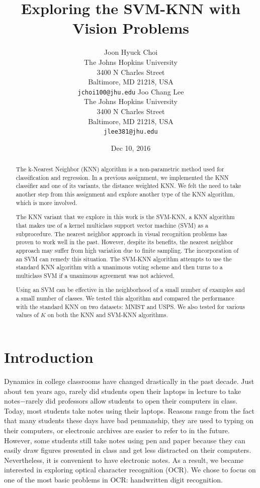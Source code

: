 \documentclass[11pt,letterpaper]{article}
\title{Exploring the SVM-KNN with Vision Problems}
\author{Joon Hyuck Choi\\
  The Johns Hopkins University\\
  3400 N Charles Street\\
  Baltimore, MD 21218, USA\\
  {\tt jchoi100@jhu.edu}
  \And
  Joo Chang Lee \\
  The Johns Hopkins University \\
  3400 N Charles Street\\
  Baltimore, MD 21218, USA\\
  {\tt jlee381@jhu.edu}}
\date{Dec 10, 2016}
\begin{document}
\maketitle
\begin{abstract}
The k-Nearest Neighbor (KNN) algorithm is a non-parametric method used for classification and regression. In a previous assignment, we implemented the KNN classifier and one of its variants, the distance weighted KNN. We felt the need to take another step from this assignment and explore another type of the KNN algorithm, which is more involved.

The KNN variant that we explore in this work is the SVM-KNN, a KNN algorithm that makes use of a kernel multiclass support vector machine (SVM) as a subprocedure. The nearest neighbor approach in visual recognition problems has proven to work well in the past. However, despite its benefits, the nearest neighbor approach may suffer from high variation due to finite sampling. The incorporation of an SVM can remedy this situation. The SVM-KNN algorithm attempts to use the standard KNN algorithm with a unanimous voting scheme and then turns to a multiclass SVM if a unanimous agreement was not achieved.

Using an SVM can be effective in the neighborhood of a small number of examples and a small number of classes. We tested this algorithm and compared the performance with the standard KNN on two datasets: MNIST and USPS. We also tested for various values of $K$ on both the KNN and SVM-KNN algorithms.

\end{abstract}

\section{Introduction}

Dynamics in college classrooms have changed drastically in the past decade. Just about ten years ago, rarely did students open their laptops in lecture to take notes$-$rarely did professors allow students to open their computers in class. Today, most students take notes using their laptops. Reasons range from the fact that many students these days have bad penmanship, they are used to typing on their computers, or electronic archives are easier to refer to in the future. However, some students still take notes using pen and paper because they can easily draw figures presented in class and get less distracted on their computers. Nevertheless, it is convenient to have electronic notes. As a result, we became interested in exploring optical character recognition (OCR). We chose to focus on one of the most basic problems in OCR: handwritten digit recognition.
\end{document}
